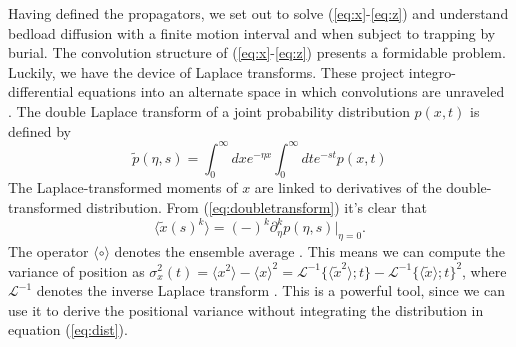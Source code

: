 \documentclass[]{agujournal2018}
\newcommand\be{\begin{equation}}
\newcommand\ee{\end{equation}}
\newcommand\bra{\langle}
\newcommand\ket{\rangle}
\newcommand\El{\mathcal{L}}
\begin{document}
Having defined the propagators, we set out to solve (\ref{eq:x}-\ref{eq:z}) and understand bedload diffusion with a finite motion interval and when subject to trapping by burial.
The convolution structure of (\ref{eq:x}-\ref{eq:z}) presents a formidable problem.
Luckily, we have the device of Laplace transforms.
These project integro-differential equations into an alternate space in which convolutions are unraveled \citep[e.g.][]{Arfken1985}.
The double Laplace transform of a joint probability distribution $p(x,t)$ is defined by 
\be \tilde{p}(\eta,s) = \int_0^\infty dx e^{-\eta x}\int_0^\infty dt e^{-st} p(x,t) \label{eq:doubletransform}\ee
The Laplace-transformed moments of $x$ are linked to derivatives of the double-transformed distribution.
From (\ref{eq:doubletransform}) it's clear that
\be \bra \tilde{x}(s)^k \ket = (-)^k\partial_\eta^k p(\eta,s)\Big|_{\eta=0}.\label{eq:momenttrick}\ee
The operator $\bra \circ \ket$ denotes the ensemble average \citep[e.g.][]{Kittel1958}.
This means we can compute the variance of position as $\sigma_x^2(t) = \bra x^2 \ket - \bra x \ket^2 = \El^{-1} \{\bra\tilde{x}^2 \ket;t\} - \El^{-1} \{\bra\tilde{x} \ket;t\}^2$, where $\El^{-1}$ denotes the inverse Laplace transform \citep[e.g.][]{Arfken1985}. This is a powerful tool, since we can use it to derive the positional variance without integrating the distribution in equation (\ref{eq:dist}).
\end{document}
